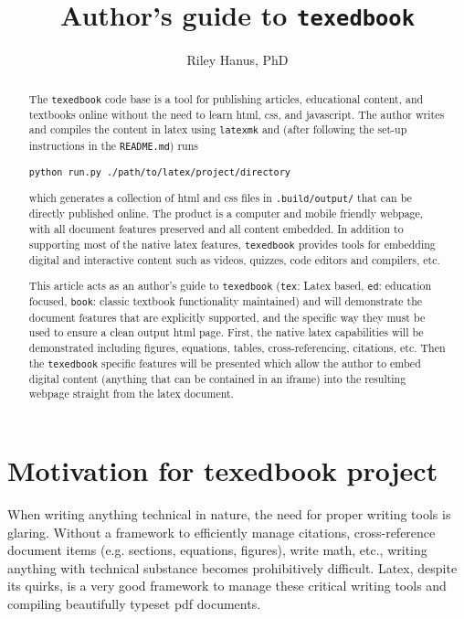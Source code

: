 \documentclass{article}
\title{Author's guide to \texttt{texedbook}}
\author{Riley Hanus, PhD}
\date{}
\begin{document}
 
\maketitle

\begin{abstract}
The \verb'texedbook' code base is a tool for publishing articles, educational content, and textbooks online without the need to learn html, css, and javascript. The author writes and compiles the content in latex using \verb'latexmk' and (after following the set-up instructions in the \verb'README.md') runs 
\begin{verbatim}
python run.py ./path/to/latex/project/directory
\end{verbatim}
which generates a collection of html and css files in \verb'.build/output/' that can be directly published online. The product is a computer and mobile friendly webpage, with all document features preserved and all content embedded.  In addition to supporting most of the native latex features, \verb'texedbook' provides tools for embedding digital and interactive content such as videos, quizzes, code editors and compilers, etc. 

This article acts as an author's guide to \verb'texedbook' (\verb'tex': Latex based, \verb'ed': education focused, \verb'book': classic textbook functionality maintained) and will demonstrate the document features that are explicitly supported, and the specific way they must be used to ensure a clean output html page.  First, the native latex capabilities will be demonstrated including figures, equations, tables, cross-referencing, citations, etc. Then the \verb'texedbook' specific features will be presented which allow the author to embed digital content (anything that can be contained in an iframe) into the resulting webpage straight from the latex document. 
\end{abstract}

\section{Motivation for texedbook project}

When writing anything technical in nature, the need for proper writing tools is glaring. Without a framework to efficiently manage citations, cross-reference document items (e.g. sections, equations, figures), write math, etc., writing anything with technical substance becomes prohibitively difficult. Latex, despite its quirks, is a very good framework to manage these critical writing tools and compiling beautifully typeset pdf documents.
\end{document}
